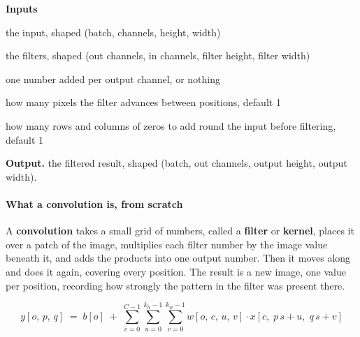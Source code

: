 \noindent\textbf{Inputs}
\begin{description}[leftmargin=2.2em,style=nextline,font=\normalfont\ttfamily]\setlength\itemsep{1pt}
  \item[{x}] \normalfont the input, shaped (batch, channels, height, width)
  \item[{weight}] \normalfont the filters, shaped (out channels, in channels, filter height, filter width)
  \item[{bias}] \normalfont one number added per output channel, or nothing
  \item[{stride}] \normalfont how many pixels the filter advances between positions, default 1
  \item[{padding}] \normalfont how many rows and columns of zeros to add round the input before filtering, default 1
\end{description}

\noindent\textbf{Output.} the filtered result, shaped (batch, out channels, output height, output width).


\paragraph{What a convolution is, from scratch}
A \textbf{convolution} takes a small grid of numbers, called a \textbf{filter} or \textbf{kernel}, places it over a patch of the image, multiplies each filter number by the image value beneath it, and adds the products into one output number. Then it moves along and does it again, covering every position. The result is a new image, one value per position, recording how strongly the pattern in the filter was present there.


\begin{equation}
y[o,\,p,\,q] \;=\; b[o] \;+\; \sum_{c=0}^{C-1} \sum_{u=0}^{k_h-1} \sum_{v=0}^{k_w-1} w[o,\,c,\,u,\,v] \cdot x[c,\;p\,s+u,\;q\,s+v]
\end{equation}

